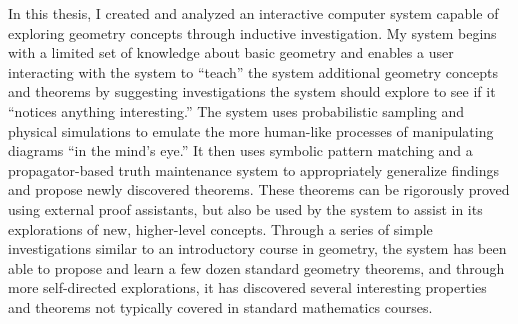 %
%
%
In this thesis, I created and analyzed an interactive computer system
capable of exploring geometry concepts through inductive
investigation.  My system begins with a limited set of knowledge about
basic geometry and enables a user interacting with the system to
``teach'' the system additional geometry concepts and theorems by
suggesting investigations the system should explore to see if it
``notices anything interesting.''  The system uses probabilistic
sampling and physical simulations to emulate the more human-like
processes of manipulating diagrams ``in the mind's eye.'' It then uses
symbolic pattern matching and a propagator-based truth maintenance
system to appropriately generalize findings and propose newly
discovered theorems. These theorems can be rigorously proved using
external proof assistants, but also be used by the system to assist in
its explorations of new, higher-level concepts. Through a series of
simple investigations similar to an introductory course in geometry,
the system has been able to propose and learn a few dozen standard
geometry theorems, and through more self-directed explorations, it has
discovered several interesting properties and theorems not typically
covered in standard mathematics courses.
